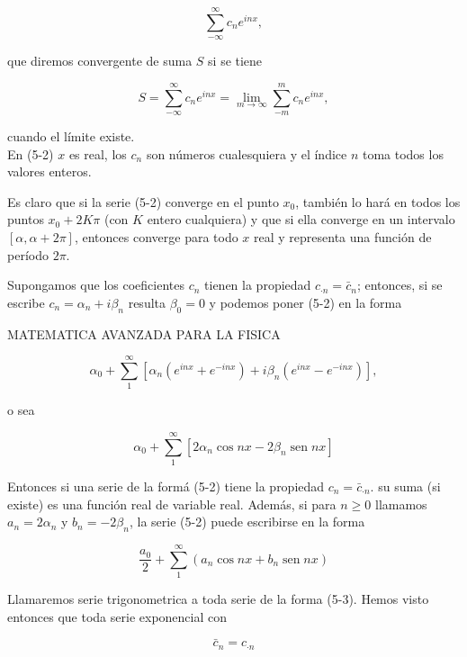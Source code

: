\documentclass[10pt]{article}
\theoremstyle{plain}
\theoremstyle{definition}
\theoremstyle{remark}
\begin{document}
\begin{equation*}
\sum_{-\infty}^{\infty} c_{n} e^{i n x}, \tag{5-1}
\end{equation*}


que diremos convergente de suma $S$ si se tiene


\begin{equation*}
S=\sum_{-\infty}^{\infty} c_{n} e^{i n x}=\lim _{m \rightarrow \infty} \sum_{-m}^{m} c_{n} e^{i n x}, \tag{5-2}
\end{equation*}


cuando el límite existe.\\
En (5-2) $x$ es real, los $c_{n}$ son números cualesquiera y el índice $n$ toma todos los valores enteros.

Es claro que si la serie (5-2) converge en el punto $x_{0}$, también lo hará en todos los puntos $x_{0}+2 K \pi$ (con $K$ entero cualquiera) y que si ella converge en un intervalo $[\alpha, \alpha+2 \pi]$, entonces converge para todo $x$ real y representa una función de período $2 \pi$.

Supongamos que los coeficientes $c_{n}$ tienen la propiedad $c_{\cdot n}=\bar{c}_{n}$; entonces, si se escribe $c_{n}=\alpha_{n}+i \beta_{n}$ resulta $\beta_{0}=0$ y podemos poner (5-2) en la forma

MATEMATICA AVANZADA PARA LA FISICA

$$
\alpha_{0}+\sum_{1}^{\infty}\left[\alpha_{n}\left(e^{i n x}+e^{-i n x}\right)+i \beta_{n}\left(e^{i n x}-e^{-i n x}\right)\right],
$$

o sea

$$
\alpha_{0}+\sum_{1}^{\infty}\left[2 \alpha_{n} \cos n x-2 \beta_{n} \operatorname{sen} n x\right]
$$

Entonces si una serie de la formá (5-2) tiene la propiedad $c_{n}=\bar{c}_{\cdot n}$. su suma (si existe) es una función real de variable real. Además, si para $n \geqslant 0$ llamamos $a_{n}=2 \alpha_{n}$ y $b_{n}=-2 \beta_{n}$, la serie (5-2) puede escribirse en la forma


\begin{equation*}
\frac{a_{0}}{2}+\sum_{1}^{\infty}\left(a_{n} \cos n x+b_{n} \operatorname{sen} n x\right) \tag{$5\cdot3$}
\end{equation*}


Llamaremos serie trigonometrica a toda serie de la forma (5-3). Hemos visto entonces que toda serie exponencial con


\begin{equation*}
\bar{c}_{n}=c_{\cdot n} \tag{5-4}
\end{equation*}
\end{document}

